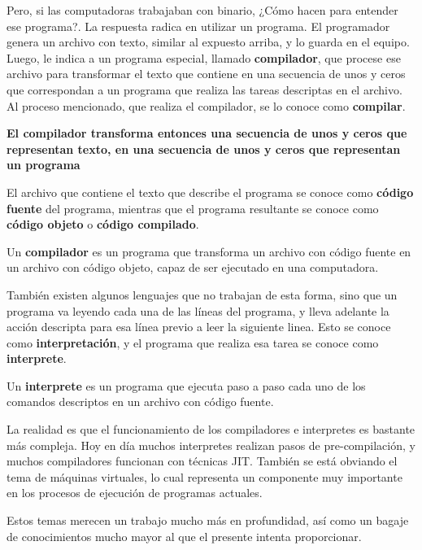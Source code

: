  Pero, si las computadoras trabajaban con
binario, ¿Cómo hacen para entender ese programa?. La respuesta radica en
utilizar un programa. El programador genera un archivo con texto, similar al
expuesto arriba, y lo guarda en el equipo. Luego, le indica a un programa
especial, llamado \textbf{compilador}, que procese ese archivo para transformar
el texto que contiene en una secuencia de unos y ceros que correspondan a un
programa que realiza las tareas descriptas en el archivo. Al proceso mencionado,
que realiza el compilador, se lo conoce como \textbf{compilar}.

\textbf{El compilador transforma entonces una secuencia de unos y ceros que
representan texto, en una secuencia de unos y ceros que representan un programa}

 El
archivo que contiene el texto que describe el programa se conoce como
\textbf{código fuente} del programa, mientras que el programa resultante se
conoce como \textbf{código objeto} o \textbf{código compilado}.

\begin{definition} Un \textbf{compilador} es un programa que
    transforma un archivo con código fuente en un archivo con código objeto,
    capaz de ser ejecutado en una computadora.
\end{definition}

 También existen algunos lenguajes que no
trabajan de esta forma, sino que un programa va leyendo cada una de las líneas
del programa, y lleva adelante la acción descripta para esa línea previo a leer
la siguiente linea. Esto se conoce como \textbf{interpretación}, y el programa
que realiza esa tarea se conoce como \textbf{interprete}.

\begin{definition} Un \textbf{interprete} es un programa que
    ejecuta paso a paso cada uno de los comandos descriptos en un archivo con
    código fuente.
\end{definition}

\begin{knowwhat}[Simplificación]
    La realidad es que el funcionamiento de los compiladores e interpretes es
    bastante más compleja. Hoy en día muchos interpretes realizan pasos de
    pre-compilación, y muchos compiladores funcionan con técnicas JIT. También
    se está obviando el tema de máquinas virtuales, lo cual representa un
    componente muy importante en los procesos de ejecución de programas
    actuales.

    Estos temas merecen un trabajo mucho más en profundidad, así como un bagaje
    de conocimientos mucho mayor al que el presente intenta proporcionar.
\end{knowwhat}

